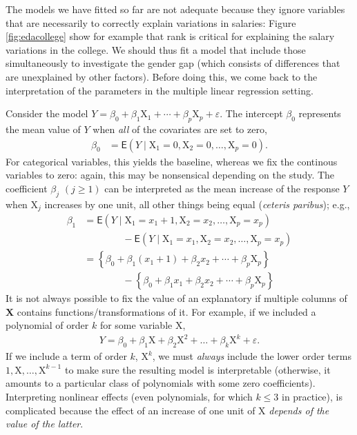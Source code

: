 \documentclass[
  11pt,
  letterpaper,
]{book}
\theoremstyle{definition}
\theoremstyle{definition}
\theoremstyle{definition}
\theoremstyle{remark}
\begin{document}
The models we have fitted so far are not adequate because they ignore variables that are necessarily to correctly explain variations in salaries: Figure \ref{fig:edacollege} show for example that rank is critical for explaining the salary variations in the college. We should thus fit a model that include those simultaneously to investigate the gender gap (which consists of differences that are unexplained by other factors). Before doing this, we come back to the interpretation of the parameters in the multiple linear regression setting.

Consider the model \(Y= \beta_0 + \beta_1 \mathrm{X}_1 + \cdots + \beta_p\mathrm{X}_p + \varepsilon\). The intercept \(\beta_0\) represents the mean value of \(Y\) when \emph{all} of the covariates are set to zero,
\begin{align*}
\beta_0 &= \mathsf{E}(Y \mid \mathrm{X}_1=0,\mathrm{X}_2=0,\ldots,\mathrm{X}_p=0).
\end{align*}
For categorical variables, this yields the baseline, whereas we fix the continous variables to zero: again, this may be nonsensical depending on the study. The coefficient \(\beta_j\) \((j \geq 1)\) can be interpreted as the mean increase of the response \(Y\) when \(\mathrm{X}_j\) increases by one unit, all other things being equal (\emph{ceteris paribus}); e.g.,
\begin{align*}
\beta_1 &= \mathsf{E}(Y \mid \mathrm{X}_1=x_1+1,\mathrm{X}_2=x_2,\ldots,\mathrm{X}_p=x_p) \\
& \qquad \qquad - \mathsf{E}(Y \mid \mathrm{X}_1=x_1,\mathrm{X}_2=x_2,\ldots,\mathrm{X}_p=x_p) \\
&= \left\{\beta_0 + \beta_1 (x_1+1) + \beta_2 x_2 + \cdots +\beta_p \mathrm{X}_p \right\} \\
& \qquad \qquad -\left\{\beta_0 + \beta_1 x_1 + \beta_2 x_2 + \cdots +\beta_p \mathrm{X}_p \right\} 
\end{align*}
It is not always possible to fix the value of an explanatory if multiple columns of \(\mathbf{X}\) contains functions/transformations of it. For example, if we included a polynomial of order \(k\) for some variable \(\mathrm{X}\),
\begin{align*}
Y=\beta_0+ \beta_1 \mathrm{X}+ \beta_2 \mathrm{X}^2 + \ldots +\beta_k \mathrm{X}^k + \varepsilon.
\end{align*}
If we include a term of order \(k\), \(\mathrm{X}^k\), we must \emph{always} include the lower order terms \(1, \mathrm{X}, \ldots, \mathrm{X}^{k-1}\) to make sure the resulting model is interpretable (otherwise, it amounts to a particular class of polynomials with some zero coefficients). Interpreting nonlinear effects (even polynomials, for which \(k\leq 3\) in practice), is complicated because the effect of an increase of one unit of \(\mathrm{X}\) \emph{depends of the value of the latter}.
\end{document}
